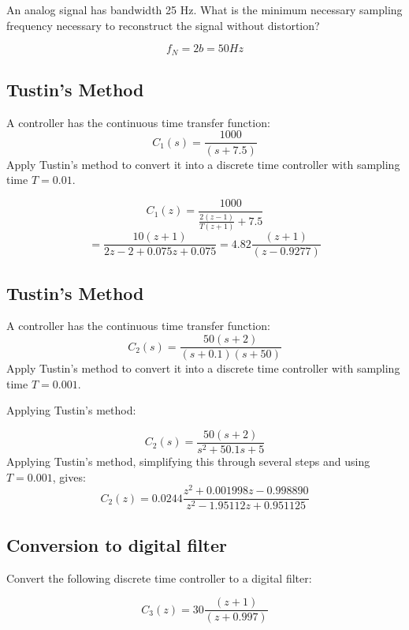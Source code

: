 \documentclass{article}	%
\begin{document}
An analog signal has bandwidth 25 Hz.   What is the minimum necessary sampling frequency necessary to reconstruct the signal without distortion?


\begin{solution}
\[
f_N = 2b = 50 Hz
\]
\end{solution}

\subsection{Tustin's Method}


A controller has the continuous time transfer function:
\[
C_1(s) = \frac{1000}{(s+7.5)}
\]
Apply Tustin's method to convert it into a discrete time controller with sampling time $T=0.01$.


\begin{solution}
\[
C_1(z) = \frac{1000}{\frac{2(z-1)}{T(z+1)} + 7.5}
\]
\[
= \frac{10(z+1)}{2z-2+0.075z + 0.075} = 4.82\frac{(z+1)}{(z-0.9277)}
\]
\end{solution}



\subsection{Tustin's Method}


A controller has the continuous time transfer function:
\[
C_2(s) = \frac{50(s+2)}{(s+0.1)(s+50)}
\]
Apply Tustin's method to convert it into a discrete time controller with sampling time $T=0.001$.

\begin{solution}
Applying Tustin's method:

\[
C_2(s) = \frac{50(s+2)}{s^2+50.1s+5}
\]
Applying Tustin's method, simplifying this through several steps and using $T=0.001$, gives:
\[
C_2(z) = 0.0244\frac  {z^2+0.001998z - 0.998890}   {z^2-1.95112z+0.951125}
\]
\end{solution}



\subsection{Conversion to digital filter}


Convert the following discrete time controller to a digital filter:

\[
C_3(z) = 30\frac{(z+1)}{(z+0.997)}
\]
\end{document}
